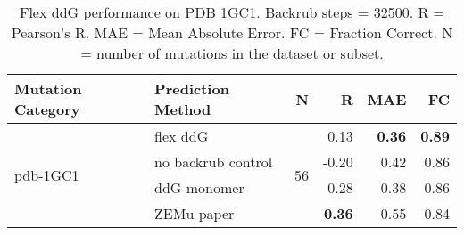 \begin{table}
  \begin{tabular}{llrrrr}
\toprule
Mutation Category &   Prediction Method &   N &     R &  MAE &   FC \\
\midrule
 \multirow{ 4}{*}{pdb-1GC1} & flex ddG & \multirow{ 4}{*}{56} & 0.13 & \textbf{0.36} & \textbf{0.89}  \\
 & no backrub control & & -0.20 & 0.42 & 0.86  \\
 & ddG monomer & & 0.28 & 0.38 & 0.86  \\
 & ZEMu paper & & \textbf{0.36} & 0.55 & 0.84  \\
\bottomrule
\end{tabular}
  \caption[Flex ddG performance on PDB 1GC1]{
    Flex ddG performance on PDB 1GC1. Backrub steps = 32500. R = Pearson's R. MAE = Mean Absolute Error. FC = Fraction Correct. N = number of mutations in the dataset or subset.
  } \label{tab:table-pdb-1GC1}
\end{table}
